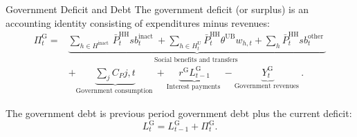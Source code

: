 \documentclass[9pt]{beamer}
\begin{document}
\begin{frame}{Government Deficit and Debt}
The government deficit (or surplus) is an accounting identity consisting of expenditures minus revenues:
\begin{equation}
\begin{aligned}
\scriptscriptstyle \Pi^{\mathrm{G}}_t= & \underbrace{\sum_{h \in H^{\text {inact }}} \bar{P}^{\mathrm{HH}}_t s b^{\text {inact }}_t+\sum_{h \in H^{\mathrm{U}}_t} \bar{P}^{\mathrm{HH}}_t \theta^{\mathrm{UB}} w_{h,t}+\sum_h \bar{P}^{\mathrm{HH}}_t s b_t^{\text {other }}}_{\text {Social benefits and transfers }} \\
& +\underbrace{\sum_j C_P{j,t}}_{\text {Government consumption }}+\underbrace{r^{\mathrm{G}} L_{t-1}^{\mathrm{G}}}_{\text {Interest payments }}-\underbrace{Y_t^{\mathrm{G}}}_{\text {Government revenues }} .
\end{aligned}
\end{equation}

The government debt is previous period government debt plus the current deficit:
\begin{equation}
    L^{\mathrm{G}}_t=L^{\mathrm{G}}_{t-1}+\Pi^{\mathrm{G}}_t.
\end{equation}
    \hyperlink{ReturnOverview}{}
\end{frame}
\end{document}
